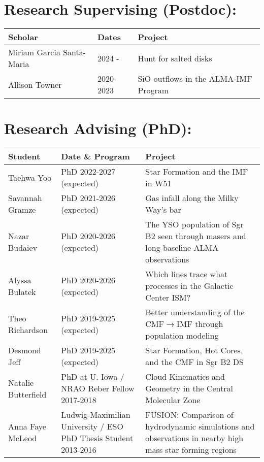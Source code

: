 \vspace{0.5cm}

\begin{minipage}{\textwidth}
\setlength{\extrarowheight}{4pt}
\section*{Research Supervising (Postdoc): }
\vspace{-12pt}
\begin{tabular}{lp{2.1in}p{2.6in}}
    Scholar & Dates  &   Project \\
    \hline
    Miriam Garcia Santa-Maria &  2024 -     & Hunt for salted disks \\
    Allison Towner            &  2020-2023  & SiO outflows in the ALMA-IMF Program \\
\end{tabular}
\end{minipage}

\vspace{0.5cm}

\begin{minipage}{\textwidth}
\setlength{\extrarowheight}{4pt}
\section*{Research Advising (PhD): }
\vspace{-12pt}
\begin{tabular}{lp{2.1in}p{2.6in}}
    Student & Date  \& Program &   Project \\
    \hline
    Taehwa Yoo          &  PhD 2022-2027 (expected) & Star Formation and the IMF in W51 \\
    Savannah Gramze     &  PhD 2021-2026 (expected) & Gas infall along the Milky Way's bar \\
    Nazar Budaiev       &  PhD 2020-2026 (expected) & The YSO population of Sgr B2 seen through masers and long-baseline ALMA observations  \\
    Alyssa Bulatek      &  PhD 2020-2026 (expected) & Which lines trace what processes in the Galactic Center ISM?  \\
    Theo Richardson     &  PhD 2019-2025 (expected)  & Better understanding of the CMF$\rightarrow$IMF through population modeling  \\
    Desmond Jeff        &  PhD 2019-2025 (expected)  & Star Formation, Hot Cores, and the CMF in Sgr B2 DS \\
    \hline
    Natalie Butterfield &  PhD at U. Iowa / NRAO Reber Fellow 2017-2018   &                     Cloud Kinematics and Geometry in the Central Molecular Zone \\
    Anna Faye McLeod    &  Ludwig-Maximilian University / ESO PhD Thesis Student 2013-2016  &  FUSION: Comparison of hydrodynamic simulations and observations in nearby high mass star forming regions  \\
\end{tabular}
\end{minipage}


